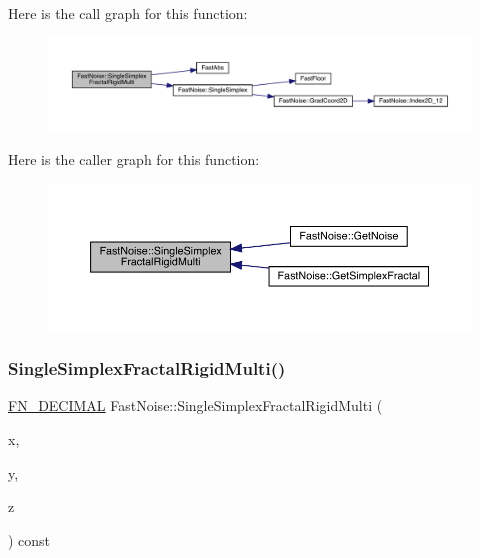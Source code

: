 Here is the call graph for this function\+:
\nopagebreak
\begin{figure}[H]
\begin{center}
\leavevmode
\includegraphics[width=350pt]{d1/dd8/class_fast_noise_a185d239a0bbbc93f673eeb1fe49eae80_cgraph}
\end{center}
\end{figure}
Here is the caller graph for this function\+:
\nopagebreak
\begin{figure}[H]
\begin{center}
\leavevmode
\includegraphics[width=350pt]{d1/dd8/class_fast_noise_a185d239a0bbbc93f673eeb1fe49eae80_icgraph}
\end{center}
\end{figure}
\mbox{\label{class_fast_noise_a6a1e4725751d679b33705fa5867f7525}} 
\subsubsection{\texorpdfstring{Single\+Simplex\+Fractal\+Rigid\+Multi()}{SingleSimplexFractalRigidMulti()}\hspace{0.1cm}{\footnotesize\ttfamily [2/2]}}
{\footnotesize\ttfamily \mbox{\hyperlink{_fast_noise_8h_a75a9ef6d2541c4921815b885bfd449c3}{F\+N\+\_\+\+D\+E\+C\+I\+M\+AL}} Fast\+Noise\+::\+Single\+Simplex\+Fractal\+Rigid\+Multi (\begin{DoxyParamCaption}\item[{\mbox{\hyperlink{_fast_noise_8h_a75a9ef6d2541c4921815b885bfd449c3}{F\+N\+\_\+\+D\+E\+C\+I\+M\+AL}}}]{x,  }\item[{\mbox{\hyperlink{_fast_noise_8h_a75a9ef6d2541c4921815b885bfd449c3}{F\+N\+\_\+\+D\+E\+C\+I\+M\+AL}}}]{y,  }\item[{\mbox{\hyperlink{_fast_noise_8h_a75a9ef6d2541c4921815b885bfd449c3}{F\+N\+\_\+\+D\+E\+C\+I\+M\+AL}}}]{z }\end{DoxyParamCaption}) const\hspace{0.3cm}{\ttfamily [private]}}

